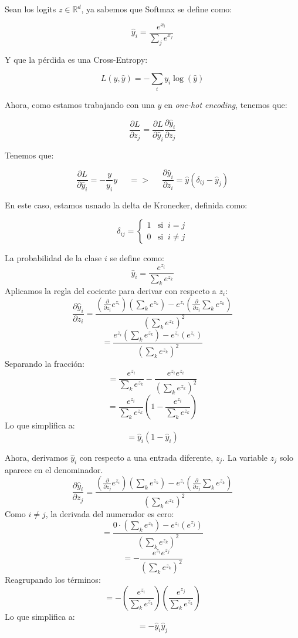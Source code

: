 Sean los logits $z \in \mathbb{R}^d$, ya sabemos que Softmax se define como:

\[
    \hat{y}_i = \frac{e^{x_i}}{\sum_{j} e^{x_j}}
\]

Y que la pérdida es una Cross-Entropy:

\[
    L(y, \hat{y}) = - \sum_i y_i \log(\hat{y})
\]

Ahora, como estamos trabajando con una $y$ en \textit{one-hot encoding}, tenemos que:

\[
    \frac{\partial L}{\partial z_j} = \frac{\partial L}{\partial \hat{y}_i} \frac{\partial \hat{y}_i}{\partial z_j}
\]

Tenemos que:

\[
    \frac{\partial L}{\partial \hat{y}_i} = -\frac{y}{y_i} y \;\;\;\;\; => \;\;\;\;\; \frac{\partial \hat{y}_i}{\partial z_i} = \hat{y} (\delta_{ij} - \hat{y}_j)
\]

En este caso, estamos usnado la delta de Kronecker, definida como:

\[
    \delta_{ij} = \begin{cases}
         1 & \text{si} \;\; i=j\\
         0 & \text{si} \;\; i \neq j
    \end{cases}
\]


La probabilidad de la clase $i$ se define como:
\[
\hat{y}_i = \frac{e^{z_i}}{\sum_k e^{z_k}}
\]
Aplicamos la regla del cociente para derivar con respecto a $z_i$:
\[
\frac{\partial \hat{y}_i}{\partial z_i} = \frac{ \left(\frac{\partial}{\partial z_i}e^{z_i}\right) \left(\sum_k e^{z_k}\right) - e^{z_i} \left(\frac{\partial}{\partial z_i}\sum_k e^{z_k}\right) }{\left(\sum_k e^{z_k}\right)^2}
\]
\[
= \frac{ e^{z_i} \left(\sum_k e^{z_k}\right) - e^{z_i} (e^{z_i}) }{\left(\sum_k e^{z_k}\right)^2}
\]
Separando la fracción:
\[
= \frac{e^{z_i}}{\sum_k e^{z_k}} - \frac{e^{z_i}e^{z_i}}{\left(\sum_k e^{z_k}\right)^2}
\]
\[
= \frac{e^{z_i}}{\sum_k e^{z_k}} \left(1 - \frac{e^{z_i}}{\sum_k e^{z_k}}\right)
\]
Lo que simplifica a:
\[
= \hat{y}_i(1 - \hat{y}_i)
\]

Ahora, derivamos $\hat{y}_i$ con respecto a una entrada diferente, $z_j$. La variable $z_j$ solo aparece en el denominador.
\[
\frac{\partial \hat{y}_i}{\partial z_j} = \frac{ \left(\frac{\partial}{\partial z_j}e^{z_i}\right) \left(\sum_k e^{z_k}\right) - e^{z_i} \left(\frac{\partial}{\partial z_j}\sum_k e^{z_k}\right) }{\left(\sum_k e^{z_k}\right)^2}
\]
Como $i \neq j$, la derivada del numerador es cero:
\[
= \frac{ 0 \cdot \left(\sum_k e^{z_k}\right) - e^{z_i} (e^{z_j}) }{\left(\sum_k e^{z_k}\right)^2}
\]
\[
= - \frac{e^{z_i} e^{z_j}}{\left(\sum_k e^{z_k}\right)^2}
\]
Reagrupando los términos:
\[
= - \left(\frac{e^{z_i}}{\sum_k e^{z_k}}\right) \left(\frac{e^{z_j}}{\sum_k e^{z_k}}\right)
\]
Lo que simplifica a:
\[
= -\hat{y}_i \hat{y}_j
\]

